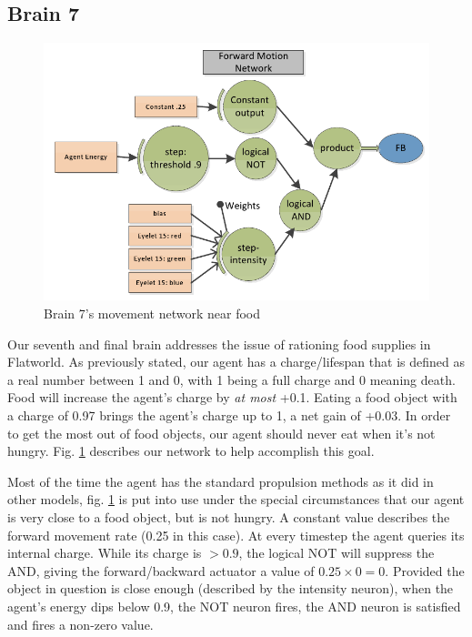 \subsection{Brain 7}
\begin{figure}
\begin{center}
  \includegraphics[scale=.5]{img/brain7.png}
  \caption{Brain 7's movement network near food}
  \label{fig:brain7}
\end{center}
\end{figure}

Our seventh and final brain addresses the issue of rationing food supplies in
Flatworld. As previously stated, our agent has a charge/lifespan that is defined
as a real number between 1 and 0, with 1 being a full charge and 0 meaning 
death. Food will increase the agent's charge by \emph{at most} +0.1. Eating 
a food object with a charge of 0.97 brings the agent's charge up to 1, a net
gain of +0.03. In order to get the most out of food objects, our agent
should never eat when it's not hungry. Fig. \ref{fig:brain7} describes our
network to help accomplish this goal.

 Most of the time the agent has the standard propulsion methods as it did in 
other models, fig. \ref{fig:brain7} is put into use under the special 
circumstances that our agent is very close to a food object, but is not hungry.
A constant value describes the forward movement rate (0.25 in this case). At 
every timestep the agent queries its internal charge. While its charge is 
$> 0.9$, the logical NOT will suppress the AND, giving the forward/backward 
actuator a value of $0.25 \times 0 = 0$. Provided the object in question is 
close enough (described by the intensity neuron), when the agent's energy dips
below 0.9, the NOT neuron fires, the AND neuron is satisfied and fires a
non-zero value.
